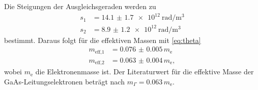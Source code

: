 Die Steigungen der Ausgleichsgeraden werden zu
\begin{align*}
    s_1 &= \SI{14.1(17)e12}{\radian\per\cubic\meter} \\
    s_2 &= \SI{8.9(12)e12}{\radian\per\cubic\meter}
\end{align*}
bestimmt. Daraus folgt für die effektiven Massen mit \ref{eq:theta}
\begin{align*}
    m_\text{eff,1} &= \num{0.076(5)} \, m_\text{e} \\
    m_\text{eff,2} &= \num{0.063(4)} \, m_\text{e},
\end{align*}
wobei $m_\text{e}$ die Elektronenmasse ist.
Der Literaturwert für die effektive Masse der GaAs-Leitungselektronen beträgt nach \cite{ioffe} $m_{\Gamma} = \num{0.063} \, m_\text{e}$.
